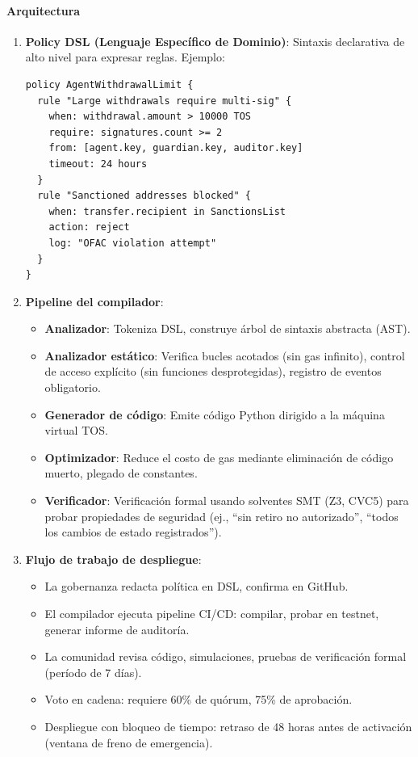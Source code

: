 \documentclass[11pt]{article}
\begin{document}
\paragraph{Arquitectura}
\begin{enumerate}[noitemsep]
  \item \textbf{Policy DSL (Lenguaje Específico de Dominio)}: Sintaxis declarativa de alto nivel para expresar reglas. Ejemplo:
  \begin{verbatim}
policy AgentWithdrawalLimit {
  rule "Large withdrawals require multi-sig" {
    when: withdrawal.amount > 10000 TOS
    require: signatures.count >= 2
    from: [agent.key, guardian.key, auditor.key]
    timeout: 24 hours
  }
  rule "Sanctioned addresses blocked" {
    when: transfer.recipient in SanctionsList
    action: reject
    log: "OFAC violation attempt"
  }
}
  \end{verbatim}
  \item \textbf{Pipeline del compilador}:
    \begin{itemize}[noitemsep]
      \item \textbf{Analizador}: Tokeniza DSL, construye árbol de sintaxis abstracta (AST).
      \item \textbf{Analizador estático}: Verifica bucles acotados (sin gas infinito), control de acceso explícito (sin funciones desprotegidas), registro de eventos obligatorio.
      \item \textbf{Generador de código}: Emite código Python dirigido a la máquina virtual TOS.
      \item \textbf{Optimizador}: Reduce el costo de gas mediante eliminación de código muerto, plegado de constantes.
      \item \textbf{Verificador}: Verificación formal usando solventes SMT (Z3, CVC5) para probar propiedades de seguridad (ej., ``sin retiro no autorizado'', ``todos los cambios de estado registrados'').
    \end{itemize}
  \item \textbf{Flujo de trabajo de despliegue}:
    \begin{itemize}[noitemsep]
      \item La gobernanza redacta política en DSL, confirma en GitHub.
      \item El compilador ejecuta pipeline CI/CD: compilar, probar en testnet, generar informe de auditoría.
      \item La comunidad revisa código, simulaciones, pruebas de verificación formal (período de 7 días).
      \item Voto en cadena: requiere 60\% de quórum, 75\% de aprobación.
      \item Despliegue con bloqueo de tiempo: retraso de 48 horas antes de activación (ventana de freno de emergencia).
    \end{itemize}
\end{enumerate}
\end{document}
